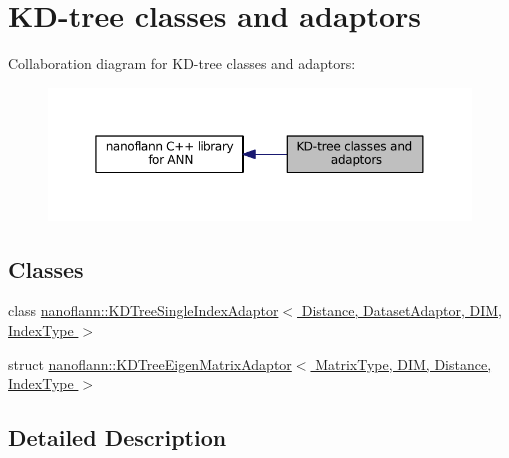 \hypertarget{group__kdtrees__grp}{\section{K\-D-\/tree classes and adaptors}
\label{group__kdtrees__grp}
}
Collaboration diagram for K\-D-\/tree classes and adaptors\-:
\nopagebreak
\begin{figure}[H]
\begin{center}
\leavevmode
\includegraphics[width=350pt]{group__kdtrees__grp}
\end{center}
\end{figure}
\subsection*{Classes}
\begin{DoxyCompactItemize}
\item 
class \hyperlink{classnanoflann_1_1_k_d_tree_single_index_adaptor}{nanoflann\-::\-K\-D\-Tree\-Single\-Index\-Adaptor$<$ Distance, Dataset\-Adaptor, D\-I\-M, Index\-Type $>$}
\item 
struct \hyperlink{structnanoflann_1_1_k_d_tree_eigen_matrix_adaptor}{nanoflann\-::\-K\-D\-Tree\-Eigen\-Matrix\-Adaptor$<$ Matrix\-Type, D\-I\-M, Distance, Index\-Type $>$}
\end{DoxyCompactItemize}


\subsection{Detailed Description}
